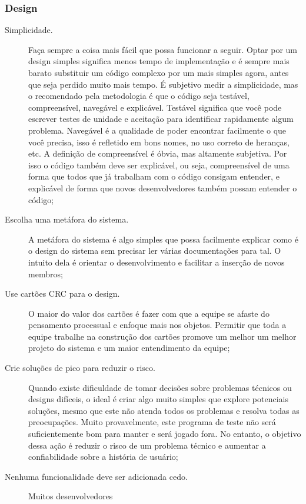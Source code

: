 \subsubsection{Design}
\begin{description}
    \item[Simplicidade.] Faça sempre a coisa mais fácil que possa funcionar a seguir.
    Optar por um design simples significa menos tempo de implementação e é sempre mais
    barato substituir um código complexo por um mais simples agora, antes que seja
    perdido muito mais tempo. É subjetivo medir a simplicidade, mas o recomendado pela
    metodologia é que o código seja testável, compreensível, navegável e explicável.
    Testável significa que você pode escrever testes de unidade e aceitação para
    identificar rapidamente algum problema. Navegável é a qualidade de poder encontrar
    facilmente o que você precisa, isso é refletido em bons nomes, no uso correto de
    heranças, etc. A definição de compreensível é óbvia, mas altamente subjetiva. Por
    isso o código também deve ser explicável, ou seja, compreensível de uma forma que
    todos que já trabalham com o código consigam entender, e explicável de forma que
    novos desenvolvedores também possam entender o código;
    \item[Escolha uma metáfora do sistema.] A metáfora do sistema é algo simples que
    possa facilmente explicar como é o design do sistema sem precisar ler várias
    documentações para tal. O intuito dela é orientar o desenvolvimento e facilitar
    a inserção de novos membros;
    \item[Use cartões \gls{CRC} para o design.] O maior do valor dos cartões é fazer
    com que a equipe se afaste do pensamento processual e enfoque mais nos objetos.
    Permitir que toda a equipe trabalhe na construção dos cartões promove um melhor
    um melhor projeto do sistema e um maior entendimento da equipe;
    \item[Crie soluções de pico para reduzir o risco.] Quando existe dificuldade
    de tomar decisões sobre problemas técnicos ou designs difíceis, o ideal é criar
    algo muito simples que explore potenciais soluções, mesmo que este não atenda
    todos os problemas e resolva todas as preocupações. Muito provavelmente, este
    programa de teste não será suficientemente bom para manter e será jogado fora.
    No entanto, o objetivo dessa ação é reduzir o risco de um problema técnico e
        aumentar a confiabilidade sobre a história de usuário;
    \item[Nenhuma funcionalidade deve ser adicionada cedo.] Muitos desenvolvedores

\end{description}
